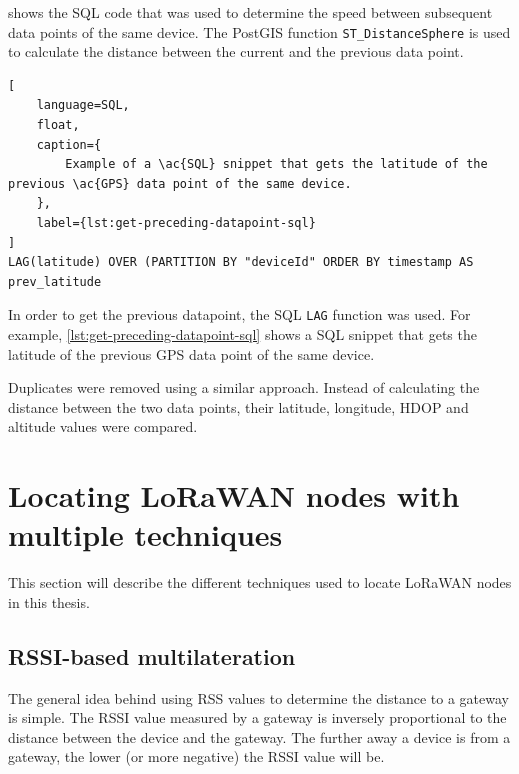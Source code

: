  shows the \ac{SQL} code that was used to determine the speed between subsequent data points of the same device.
The PostGIS function \lstinline|ST_DistanceSphere| is used to calculate the distance between the current and the previous data point.

\begin{lstlisting}[
    language=SQL,
    float,
    caption={
        Example of a \ac{SQL} snippet that gets the latitude of the previous \ac{GPS} data point of the same device.
    },
    label={lst:get-preceding-datapoint-sql}
]
LAG(latitude) OVER (PARTITION BY "deviceId" ORDER BY timestamp AS prev_latitude
\end{lstlisting}

In order to get the previous datapoint, the SQL \lstinline|LAG| function was used.
For example, \cref{lst:get-preceding-datapoint-sql} shows a \ac{SQL} snippet that gets the latitude of the previous \ac{GPS} data point of the same device.

Duplicates were removed using a similar approach.
Instead of calculating the distance between the two data points, their latitude, longitude, \ac{HDOP} and altitude values were compared.

\section{Locating \acs{LoRaWAN} nodes with multiple techniques}

This section will describe the different techniques used to locate \ac{LoRaWAN} nodes in this thesis.

\subsection{\acs{RSSI}-based multilateration}\label{sec:rssi-based-multilateration-implementation}

The general idea behind using \ac{RSS} values to determine the distance to a gateway is simple.
The \ac{RSSI} value measured by a gateway is inversely proportional to the distance between the device and the gateway.
The further away a device is from a gateway, the lower (or more negative) the \ac{RSSI} value will be.

